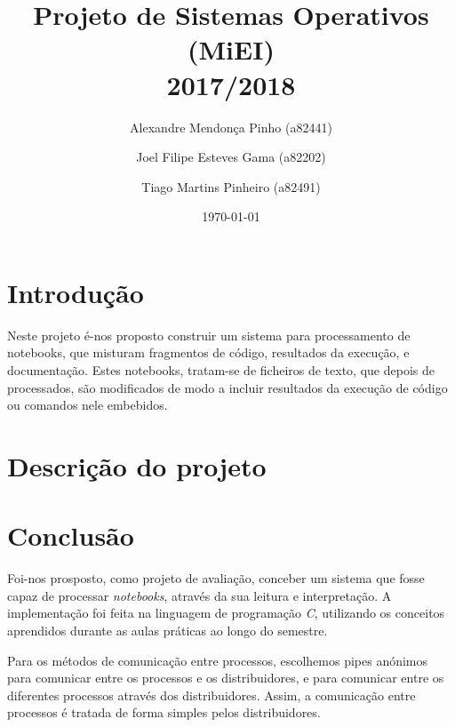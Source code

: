 \documentclass[12pt]{report}
\title{Projeto de Sistemas Operativos (MiEI) \\ 2017/2018}
\author{Alexandre Mendonça Pinho (a82441) \and Joel Filipe Esteves Gama (a82202) \and Tiago Martins Pinheiro (a82491)}
\date{\today}
\newcommand\tab[1][0.5cm]{\hspace*{#1}}
\begin{document}
\maketitle

\tableofcontents

\chapter{Introdução}
\label{sec:introducao}

\tab Neste projeto é-nos proposto construir um sistema para processamento de notebooks, que misturam fragmentos de código, resultados da execução, e documentação. Estes notebooks, tratam-se de ficheiros de texto, que depois de processados, são modificados de modo a incluir resultados da execução de código ou comandos nele embebidos.

\chapter{Descrição do projeto}
\label{sec:descricao}


\chapter{Conclusão}
\label{sec:conclusao}

\tab Foi-nos prosposto, como projeto de avaliação, conceber um sistema que fosse capaz de processar \textit{notebooks}, através da sua leitura e  interpretação. A implementação foi feita na linguagem de programação \textit{C}, utilizando os conceitos aprendidos durante as aulas práticas ao longo do semestre. 

Para os métodos de comunicação entre processos, escolhemos pipes anónimos para comunicar entre os processos e os distribuidores, e  para comunicar entre os diferentes processos através dos distribuidores. Assim, a comunicação entre processos é tratada de forma simples pelos distribuidores.
\end{document}
